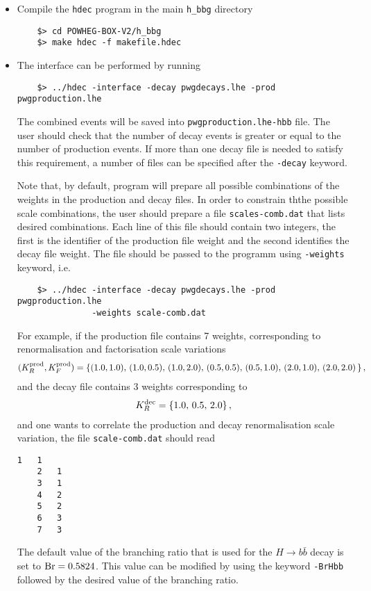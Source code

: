 \documentclass[11pt,a4paper]{article}\pdfoutput=1
\newcommand{\hbbg}{{\tt{h\_bbg}}}
\newcommand{\Hbb}[1]{\ensuremath{H\to b\bar{b}{#1}}}
\begin{document}
\begin{itemize}
\item Compile the {\tt{hdec}} program in the main \hbbg{} directory
  \begin{lstlisting}
    $> cd POWHEG-BOX-V2/h_bbg
    $> make hdec -f makefile.hdec
  \end{lstlisting}
\item The interface can be performed by running
  \begin{lstlisting}
    $> ../hdec -interface -decay pwgdecays.lhe -prod pwgproduction.lhe
  \end{lstlisting}
  The combined events will be saved into {\tt{pwgproduction.lhe-hbb}}
  file. The user should check that the number of decay events is
  greater or equal to the number of production events.  If more than
  one decay file is needed to satisfy this requirement, a number of
  files can be specified after the {\tt{-decay}} keyword.

  Note that, by default, program will prepare all possible
  combinations of the weights in the production and decay files. In
  order to constrain ththe possible scale combinations, the user
  should prepare a file {\tt{scales-comb.dat}} that lists desired
  combinations. Each line of this file should contain two integers,
  the first is the identifier of the production file weight and the
  second identifies the decay file weight. The file should be passed
  to the programm using {\tt{-weights}} keyword, i.e.
  \begin{lstlisting}
    $> ../hdec -interface -decay pwgdecays.lhe -prod pwgproduction.lhe
               -weights scale-comb.dat
  \end{lstlisting}

  For example, if the production file contains 7 weights,
  corresponding to renormalisation and factorisation scale variations
  \begin{align}
    (K_{R}^{\rm{prod}},K_{F}^{\rm{prod}}) = \{
    (1.0, 1.0),\,
    (1.0, 0.5),\,
    (1.0, 2.0),\,
    (0.5, 0.5),\,
    (0.5, 1.0),\,
    (2.0, 1.0),\,
    (2.0, 2.0)\,
    \}\,,
  \end{align}
  and the decay file contains 3 weights corresponding to
  \begin{align}
    K_{R}^{\rm{dec}} = \{ 1.0,\, 0.5,\, 2.0 \}\,,
  \end{align}
  and one wants to correlate the production and decay renormalisation
  scale variation, the file {\tt{scale-comb.dat}} should read
  \begin{lstlisting}[basicstyle=\small\ttfamily\color{black}]
    1   1
    2   1
    3   1
    4   2
    5   2
    6   3
    7   3
  \end{lstlisting}

  The default value of the branching ratio that is used for the \Hbb{}
  decay is set to $\rm{Br} = 0.5824$. This value can be modified by
  using the keyword {\tt{-BrHbb}} followed by the desired value of the
  branching ratio.
\end{itemize}
\end{document}
